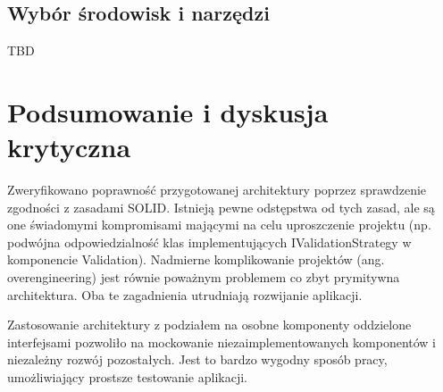 \documentclass[12pt]{article}
\begin{document}
\subsection{Wybór środowisk i narzędzi}

TBD

\section{Podsumowanie i dyskusja krytyczna}

Zweryfikowano poprawność przygotowanej architektury poprzez sprawdzenie zgodności z zasadami SOLID. Istnieją pewne odstępstwa od tych zasad, ale są one świadomymi kompromisami mającymi na celu uproszczenie projektu (np. podwójna odpowiedzialność klas implementujących IValidationStrategy w komponencie Validation). Nadmierne komplikowanie projektów (ang. overengineering) jest równie poważnym problemem co zbyt prymitywna architektura. Oba te zagadnienia utrudniają rozwijanie aplikacji.

Zastosowanie architektury z podziałem na osobne komponenty oddzielone interfejsami pozwoliło na mockowanie niezaimplementowanych komponentów i niezależny rozwój pozostałych. Jest to bardzo wygodny sposób pracy, umożliwiający prostsze testowanie aplikacji.



\listoffigures
\end{document}
